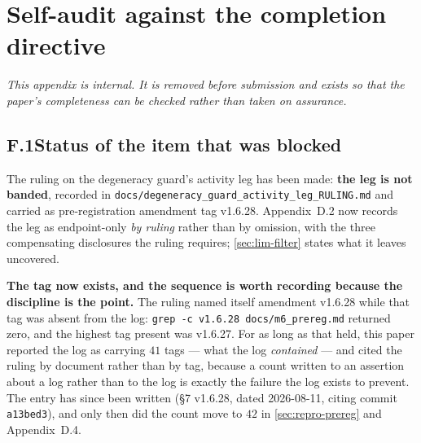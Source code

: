 %
\section{Self-audit against the completion directive}
\label{app:audit}

\emph{This appendix is internal. It is removed before submission and exists so that the paper's
completeness can be checked rather than taken on assurance.}

\subsection*{F.1\quad Status of the item that was blocked}

The ruling on the degeneracy guard's activity leg has been made: \textbf{the leg is not banded},
recorded in \texttt{docs/degeneracy\_guard\_activity\_leg\_RULING.md} and carried as
pre-registration amendment tag v1.6.28. Appendix~D.2 now records the leg as endpoint-only
\emph{by ruling} rather than by omission, with the three compensating disclosures the ruling
requires; \cref{sec:lim-filter} states what it leaves uncovered.

\textbf{The tag now exists, and the sequence is worth recording because the discipline is the
point.} The ruling named itself amendment v1.6.28 while that tag was absent from the log:
\texttt{grep -c v1.6.28 docs/m6\_prereg.md} returned zero, and the highest tag present was
v1.6.27. For as long as that held, this paper reported the log as carrying $41$ tags --- what the
log \emph{contained} --- and cited the ruling by document rather than by tag, because a count
written to an assertion about a log rather than to the log is exactly the failure the log exists
to prevent. The entry has since been written (\S7 v1.6.28, dated 2026-08-11, citing commit
\texttt{a13bed3}), and only then did the count move to $42$ in \cref{sec:repro-prereg} and
Appendix~D.4.

